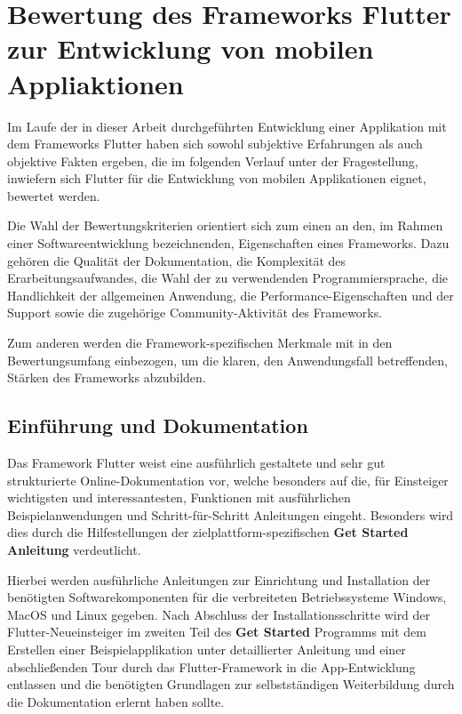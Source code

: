\documentclass[bibliography=totoc,listof=totoc,BCOR=5mm,DIV=12,oneside]{scrbook}
\begin{document}
{\newpage
\section{Bewertung des Frameworks Flutter zur Entwicklung von mobilen Appliaktionen}
\par Im Laufe der in dieser Arbeit durchgeführten Entwicklung einer Applikation mit dem Frameworks Flutter haben sich sowohl subjektive Erfahrungen als auch objektive Fakten ergeben, die im folgenden Verlauf unter der Fragestellung, inwiefern sich Flutter für die Entwicklung von mobilen Applikationen eignet, bewertet werden.

\par \bigskip Die Wahl der Bewertungskriterien orientiert sich zum einen an den, im Rahmen einer Softwareentwicklung bezeichnenden, Eigenschaften eines Frameworks. Dazu gehören die Qualität der Dokumentation, die Komplexität des Erarbeitungsaufwandes, die Wahl der zu verwendenden Programmiersprache, die  Handlichkeit der allgemeinen Anwendung, die Performance-Eigenschaften und der Support sowie die zugehörige Community-Aktivität des Frameworks. \par Zum anderen werden die Framework-spezifischen Merkmale mit in den Bewertungsumfang einbezogen, um die klaren, den Anwendungsfall betreffenden, Stärken des Frameworks abzubilden.

\subsection{Einführung und Dokumentation}
\par Das Framework Flutter weist eine ausführlich gestaltete und sehr gut strukturierte Online-Dokumentation vor, welche besonders auf die, für Einsteiger wichtigsten und interessantesten, Funktionen mit ausführlichen Beispielanwendungen und Schritt-für-Schritt Anleitungen eingeht.
Besonders wird dies durch die Hilfestellungen der zielplattform-spezifischen \textbf{Get Started Anleitung}\citep{FlutterGetStarted}  verdeutlicht.

\par \bigskip Hierbei werden ausführliche Anleitungen zur Einrichtung und Installation der benötigten Softwarekomponenten für die verbreiteten Betriebssysteme Windows, MacOS und Linux  gegeben. Nach Abschluss der Installationsschritte wird der Flutter-Neueinsteiger im zweiten Teil des \textbf{Get Started} Programms mit dem Erstellen einer Beispielapplikation unter detaillierter Anleitung und einer abschließenden Tour durch das Flutter-Framework in die App-Entwicklung entlassen und die benötigten Grundlagen zur selbstständigen Weiterbildung durch die Dokumentation erlernt haben sollte. 

}
\end{document}
